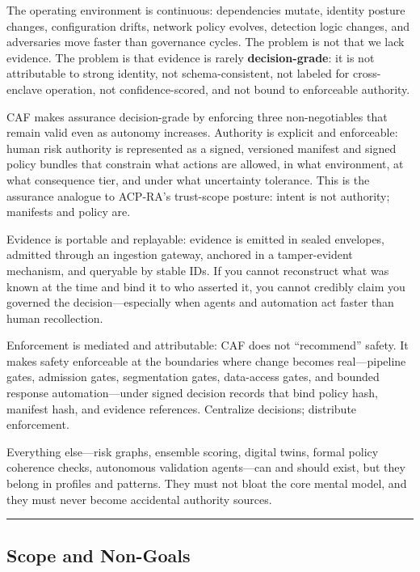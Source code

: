 \documentclass[11pt]{article}
\begin{document}
The operating environment is continuous: dependencies mutate, identity posture changes, configuration drifts, network policy evolves, detection logic changes, and adversaries move faster than governance cycles. The problem is not that we lack evidence.
The problem is that evidence is rarely \textbf{decision-grade}: it is
not attributable to strong identity, not schema-consistent, not labeled
for cross-enclave operation, not confidence-scored, and not bound to
enforceable authority.

CAF makes assurance decision-grade by enforcing three non-negotiables that remain valid even as autonomy increases. Authority is explicit and enforceable: human risk authority is represented as a signed, versioned manifest and signed policy bundles that constrain what actions are allowed, in what environment, at what consequence tier, and under what uncertainty tolerance. This is the assurance analogue to ACP-RA's trust-scope posture: intent is not authority; manifests and policy are. \cite{ACPRA}

Evidence is portable and replayable: evidence is emitted in sealed envelopes, admitted through an ingestion gateway, anchored in a tamper-evident mechanism, and queryable by stable IDs. If you cannot reconstruct what was known at the time and bind it to who asserted it, you cannot credibly claim you governed the decision---especially when agents and automation act faster than human recollection. \cite{ACPRA}

Enforcement is mediated and attributable: CAF does not ``recommend'' safety. It makes safety enforceable at the boundaries where change becomes real---pipeline gates, admission gates, segmentation gates, data-access gates, and bounded response automation---under signed decision records that bind policy hash, manifest hash, and evidence references. Centralize decisions; distribute enforcement. \cite{ACPRA}

Everything else---risk graphs, ensemble scoring, digital twins, formal policy coherence checks, autonomous validation agents---can and should exist, but they belong in profiles and patterns. They must not bloat the core mental model, and they must never become accidental authority sources.

\begin{center}\rule{0.5\linewidth}{0.5pt}\end{center}

\hypertarget{scope-and-non-goals}{%
\subsection{Scope and Non-Goals}\label{scope-and-non-goals}}
\end{document}
